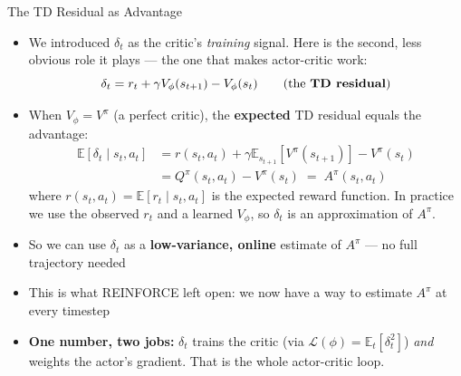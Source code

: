\begin{frame}{The TD Residual as Advantage}
\begin{itemize}
    \item We introduced $\delta_t$ as the critic's \emph{training} signal. Here is the second, less obvious role it plays --- the one that makes actor-critic work:
    $$\delta_t = r_t + \gamma V_\phi(s_{t+1}) - V_\phi(s_t) \qquad \text{(the \textbf{TD residual})}$$
    \item When $V_\phi = V^{\pi}$ (a perfect critic), the \textbf{expected} TD residual equals the advantage:
    \begin{align*}
        \mathbb{E}\!\left[\delta_t \mid s_t, a_t\right]
        &= r(s_t,a_t) + \gamma \mathbb{E}_{s_{t+1}}\!\left[V^{\pi}(s_{t+1})\right] - V^{\pi}(s_t) \\
        &= Q^{\pi}(s_t,a_t) - V^{\pi}(s_t) \;=\; A^{\pi}(s_t,a_t)
    \end{align*}
    where $r(s_t,a_t) = \mathbb{E}[r_t \mid s_t, a_t]$ is the expected reward function. In practice we use the observed $r_t$ and a learned $V_\phi$, so $\delta_t$ is an approximation of $A^{\pi}$.
    \pause
    \item So we can use $\delta_t$ as a \textbf{low-variance, online} estimate of $A^{\pi}$ --- no full trajectory needed
    \item This is what REINFORCE left open: we now have a way to estimate $A^{\pi}$ at every timestep
    \vspace{0.5em}
    \item \textbf{One number, two jobs:} $\delta_t$ trains the critic (via $\mathcal{L}(\phi) = \mathbb{E}_t[\delta_t^2]$) \emph{and} weights the actor's gradient. That is the whole actor-critic loop.
\end{itemize}
\end{frame}
